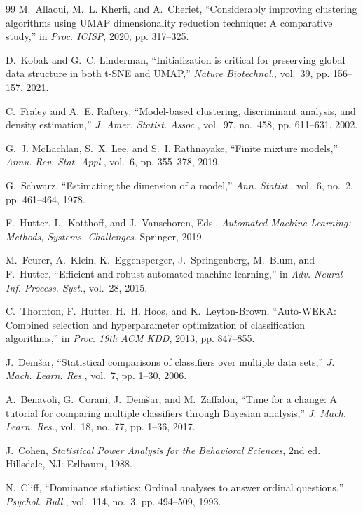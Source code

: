 \documentclass[journal]{IEEEtran}
\begin{document}
\begin{thebibliography}{99}
M.~Allaoui, M.~L. Kherfi, and A.~Cheriet, ``Considerably improving clustering algorithms using UMAP dimensionality reduction technique: A comparative study,'' in \emph{Proc. ICISP}, 2020, pp. 317--325.

D.~Kobak and G.~C. Linderman, ``Initialization is critical for preserving global data structure in both t-SNE and UMAP,'' \emph{Nature Biotechnol.}, vol.~39, pp. 156--157, 2021.

C.~Fraley and A.~E. Raftery, ``Model-based clustering, discriminant analysis, and density estimation,'' \emph{J. Amer. Statist. Assoc.}, vol.~97, no.~458, pp. 611--631, 2002.

G.~J. McLachlan, S.~X. Lee, and S.~I. Rathnayake, ``Finite mixture models,'' \emph{Annu. Rev. Stat. Appl.}, vol.~6, pp. 355--378, 2019.

G.~Schwarz, ``Estimating the dimension of a model,'' \emph{Ann. Statist.}, vol.~6, no.~2, pp. 461--464, 1978.

F.~Hutter, L.~Kotthoff, and J.~Vanschoren, Eds., \emph{Automated Machine Learning: Methods, Systems, Challenges}. Springer, 2019.

M.~Feurer, A.~Klein, K.~Eggensperger, J.~Springenberg, M.~Blum, and F.~Hutter, ``Efficient and robust automated machine learning,'' in \emph{Adv. Neural Inf. Process. Syst.}, vol.~28, 2015.

C.~Thornton, F.~Hutter, H.~H. Hoos, and K.~Leyton-Brown, ``Auto-WEKA: Combined selection and hyperparameter optimization of classification algorithms,'' in \emph{Proc. 19th ACM KDD}, 2013, pp. 847--855.

J.~Dem\v{s}ar, ``Statistical comparisons of classifiers over multiple data sets,'' \emph{J. Mach. Learn. Res.}, vol.~7, pp. 1--30, 2006.

A.~Benavoli, G.~Corani, J.~Dem\v{s}ar, and M.~Zaffalon, ``Time for a change: A tutorial for comparing multiple classifiers through Bayesian analysis,'' \emph{J. Mach. Learn. Res.}, vol.~18, no.~77, pp. 1--36, 2017.

J.~Cohen, \emph{Statistical Power Analysis for the Behavioral Sciences}, 2nd ed. Hillsdale, NJ: Erlbaum, 1988.

N.~Cliff, ``Dominance statistics: Ordinal analyses to answer ordinal questions,'' \emph{Psychol. Bull.}, vol.~114, no.~3, pp. 494--509, 1993.


\end{thebibliography}
\end{document}

